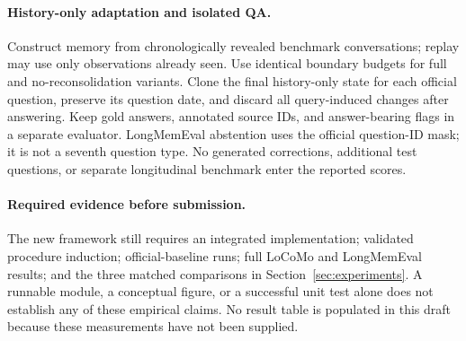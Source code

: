 \documentclass{article}
\begin{document}
\paragraph{History-only adaptation and isolated QA.}
Construct memory from chronologically revealed benchmark conversations;
replay may use only observations already seen. Use identical boundary budgets
for full and no-reconsolidation variants. Clone the final history-only state
for each official question, preserve its question date, and discard all
query-induced changes after answering. Keep gold answers, annotated source
IDs, and answer-bearing flags in a separate evaluator. LongMemEval abstention
uses the official question-ID mask; it is not a seventh question type.
No generated corrections, additional test questions, or separate longitudinal
benchmark enter the reported scores.

\paragraph{Required evidence before submission.}
The new framework still requires an integrated implementation; validated
procedure induction; official-baseline runs; full LoCoMo and LongMemEval
results; and the three matched comparisons in Section~\ref{sec:experiments}.
A runnable module, a conceptual figure, or a successful unit test alone does
not establish any of these empirical claims. No result table is populated
in this draft because these measurements have not been supplied.
\end{document}
